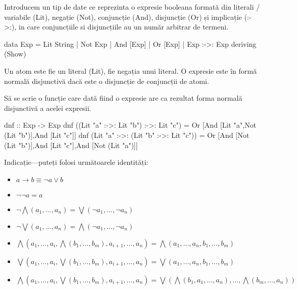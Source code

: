 \documentclass[addpoints,12pt,a4paper]{exam}
\begin{document}
\begin{questions}
\question[3] 
Introducem un tip de date ce reprezinta o expresie booleana formată din literali / variabile (Lit), negație (Not), conjuncție (And), disjuncție (Or) și implicație (:->:), in care conjuncțiile si disjuncțiile au un număr arbitrar de termeni. 
\begin{asciihs}
data Exp = Lit String
         | Not Exp
         | And [Exp]
         | Or [Exp]
         | Exp :->: Exp
  deriving (Show)
\end{asciihs}

Un atom este fie un literal (Lit), fie negația unui literal. O expresie este în formă normală disjunctivă dacă este o disjuncție de conjuncții de atomi.

Să se scrie o funcție care dată fiind o expresie are ca rezultat forma normală disjunctivă a acelei expresii.

\begin{asciihs}
   dnf :: Exp -> Exp
   dnf ((Lit "a" :->: Lit "b") :->: Lit "c")
     = Or [And [Lit "a",Not (Lit "b")],And [Lit "c"]]
   dnf (Lit "a" :->: (Lit "b" :->: Lit "c"))
     = Or [And [Not (Lit "b")],And [Lit "c"],And [Not (Lit "a")]]
\end{asciihs}

Indicație---puteți folosi următoarele identități:
\begin{itemize}
\item $a \rightarrow b \equiv \neg a \vee b$
\item $\neg \neg a = a$
\item $\neg\bigwedge (a_1,\ldots,a_n) = \bigvee(\neg a_1,\ldots,\neg a_n)$
\item $\neg\bigvee (a_1,\ldots,a_n) = \bigwedge(\neg a_1,\ldots,\neg a_n)$
\item $\bigwedge{\left(a_1,\ldots,a_i,\bigwedge (b_1,\ldots,b_m),a_{i+1},\ldots,a_n\right)}
= \bigwedge (a_1,\ldots,a_n,b_1,\ldots,b_m)$
\item $\bigvee{\left(a_1,\ldots,a_i,\bigvee (b_1,\ldots,b_m),a_{i+1},\ldots,a_n\right)}
= \bigvee (a_1,\ldots,a_n,b_1,\ldots,b_m)$
\item $\bigwedge{\left(a_1,\ldots,a_i,\bigvee (b_1,\ldots,b_m),a_{i+1},\ldots,a_n\right)}
= \bigvee{\left(\bigwedge(b_1,a_1,\ldots,a_n),\ldots,\bigwedge(b_m,\ldots,a_n)\right)}$
\end{itemize}

\end{questions}
\end{document}
